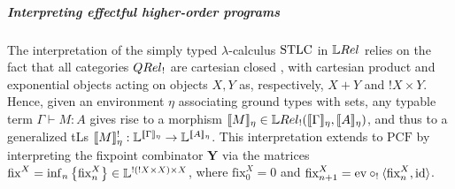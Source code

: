 \subparagraph*{Interpreting effectful higher-order programs}
The interpretation of the simply typed $\lambda$-calculus $\mathrm{STLC}$ in $\LREL$ relies on the fact that all categories $\QREL_{!}$ are cartesian closed \cite{Manzo2013}, with cartesian product and exponential objects acting on objects $X,Y$ as, respectively, $X+Y$ and $!X\times Y$. 
Hence, given an environment $\eta$ associating ground types with sets, any 
typable term $\Gamma \vdash M:A$ gives rise to a morphism 
$\model{M}_{\eta}\in \LREL_{!}(\model{\Gamma}_{\eta}, \model{A}_{\eta})$, and thus to a generalized tLs $\llbracket M\rrbracket_{\eta}^{!}:\mathbb{L}^{\llbracket\Gamma\rrbracket_{\eta}}\to \mathbb{L}^{\llbracket A\rrbracket_{\eta}}$. 
This interpretation extends to $\mathrm{PCF}$ by interpreting the fixpoint combinator $\mathbf Y$ via the matrices $\mathrm{fix}^{X}= \inf_{n}\big\{\mathrm{fix}^{X}_{n}\big\} \in \mathbb{L}^{  !(!X\times X) \times X  }$, where 
 $\mathrm{fix}^{X}_{0}=0$ and $\mathrm{fix}^{X}_{n+1}= \mathrm{ev}\circ_{!}\langle \mathrm{fix}_{n}^{X}, \mathrm{id} \rangle $.
 
 


